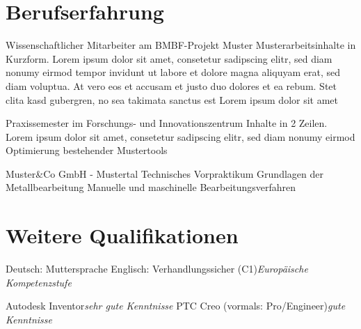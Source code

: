 \documentclass[11pt,a4paper]{moderncv}
\newcommand{\doit}{\newline} %
\begin{document}
\section{Berufserfahrung} 
{\doit Wissenschaftlicher Mitarbeiter am BMBF-Projekt \glqq Muster\grqq{}}
{\doit Musterarbeitsinhalte in Kurzform. Lorem ipsum dolor sit amet, consetetur sadipscing elitr, sed diam nonumy eirmod tempor invidunt ut labore et dolore magna aliquyam erat, sed diam voluptua. At vero eos et accusam et justo duo dolores et ea rebum. Stet clita kasd gubergren, no sea takimata sanctus est Lorem ipsum dolor sit amet}
{}
{}  %

{\doit Praxissemester im Forschungs- und Innovationszentrum}
{\doit Inhalte in 2 Zeilen. Lorem ipsum dolor sit amet, consetetur sadipscing elitr, sed diam nonumy eirmod}
{Optimierung bestehender Mustertools}
{}  %

{Muster\&Co GmbH - Mustertal}
{\doit Technisches Vorpraktikum}
{\doit Grundlagen der Metallbearbeitung}
{Manuelle und maschinelle Bearbeitungsverfahren}
{}  %



%

\section{Weitere Qualifikationen} 

{Deutsch: Muttersprache\newline
Englisch: Verhandlungssicher (C1)\hfill {\scriptsize \itshape Europäische Kompetenzstufe}}

{Autodesk Inventor\hfill {\scriptsize \itshape sehr gute Kenntnisse}\newline
PTC Creo (vormals: Pro/Engineer)\hfill {\scriptsize \itshape gute Kenntnisse}}
\end{document}
